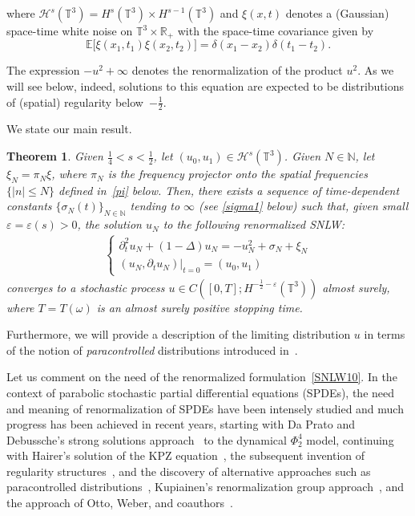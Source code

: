 \documentclass[%
11pt,  reqno]{amsart}
\newtheorem{theorem}{Theorem} [section]
\newcommand{\1}{\hspace{0.2mm}\text{I}\hspace{0.2mm}}
\newcommand{\noi}{\noindent}
\newcommand{\R}{\mathbb{R}}
\newcommand{\T}{\mathbb{T}}
\newcommand{\E}{\mathbb{E}}
\newcommand{\dl}{\delta}
\newcommand{\Dl}{\Delta}
\newcommand{\eps}{\varepsilon}
\newcommand{\s}{\sigma}
\newcommand{\dt}{\partial_t}
\renewcommand{\o}{\omega}
\newcommand{\N}{\mathbb{N}}
\renewcommand{\H}{\mathcal{H}}
\numberwithin{equation}{section}
\numberwithin{theorem}{section}
\begin{document}
\noi
where  $\H^s(\T^3) = H^s(\T^3)\times H^{s-1}(\T^3)$
 and $\xi(x, t)$ denotes a (Gaussian) space-time white noise on $\T^3\times \R_+$
with the space-time covariance given by
\[ \E\big[ \xi(x_1, t_1) \xi(x_2, t_2) \big]
= \dl(x_1 - x_2) \dl (t_1 - t_2).\]

\noi
The expression $-u^2+\infty$ denotes the renormalization of the product $u^2$. 
As we will see below, indeed, solutions to this equation are expected to be distributions 
of (spatial) regularity below~$-\frac12$. 


We state our main result.

\begin{theorem}\label{THM:2-intro}
Given $\frac 14 < s < \frac 12$, 
let $(u_0, u_1) \in \H^{s}(\T^3)$.
Given $N \in \N$, let $ \xi_N =  \pi_N \xi$, 
where $\pi_N$ is the frequency projector onto the spatial frequencies $\{|n|\leq N\}$
defined in~\eqref{pi} below.
Then,  there exists a sequence of time-dependent constants $\{\s_N(t)\}_{N\in \N}$
 tending to $\infty$ \textup{(}see \eqref{sigma1} below\textup{)} such that, given small $\eps = \eps(s) > 0$, 
the solution $u_N$ to the following renormalized SNLW:
\begin{align}
\begin{cases}
\dt^2 u_N + (1-  \Dl)  u_N  =  - u_N^2  + \s_N+ \xi_N\\
(u_N, \dt u_N)|_{t = 0} = (u_0, u_1)
\end{cases}
\label{SNLW10}
\end{align}
converges to a stochastic process $u \in C([0, T]; H^{-\frac 12 -\eps} (\T^3))$ almost surely,
where $T = T(\o)$ is an almost surely positive stopping time.
\end{theorem}


Furthermore, 
 we will provide a description of the limiting distribution $u$ in terms of the notion of 
 \emph{paracontrolled} distributions introduced in~\cite{GIP}. 

Let us comment on the need of the renormalized formulation~\eqref{SNLW10}. 
In the context of parabolic stochastic partial differential equations (SPDEs),  the need and meaning of renormalization of SPDEs have been intensely studied and much progress has been achieved
in recent years, starting with Da Prato and Debussche's strong solutions approach~\cite{DPD2} to the dynamical $\Phi^4_2$ model, continuing with Hairer's solution of the KPZ equation~\cite{Hairer0}, the subsequent invention of regularity structures~\cite{Hairer},
 and the discovery of alternative approaches such as paracontrolled distributions~\cite{GIP}, Kupiainen's 
 renormalization group  approach~\cite{Kupi, kupiainen_renormalization_2017},
and  the approach of Otto, Weber, and coauthors~\cite{otto_quasilinear_2016, bailleul_quasilinear_2016, otto_parabolic_2018}. 
\end{document}
